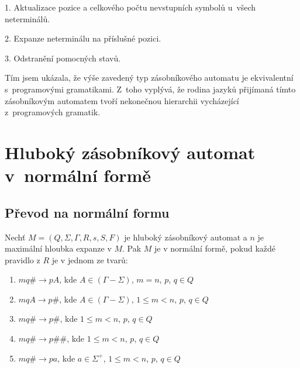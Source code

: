 \begin{list}{}{\setlength\parsep{0cm} \setlength\itemsep{0cm} \setlength\leftmargin{1em}}
\item 1. Aktualizace pozice a celkového počtu nevstupních symbolů u~všech neterminálů.
\item 2. Expanze neterminálu na příslušné pozici.
\item 3. Odstranění pomocných stavů.
\end{list}

Tím jsem ukázala, že výše zavedený typ zásobníkového automatu je ekvivalentní s~programovými gramatikami. Z~toho vyplývá, že rodina jazyků přijímaná tímto zásobníkovým automatem tvoří nekonečnou hierarchii vycházející z~programových gramatik.

\chapter{Hluboký zásobníkový automat v~normální formě}



\section{Převod na normální formu}


\begin{Def}
Nechť $M = (Q,\Sigma,\Gamma, R, s, S , F)$ je hluboký zásobníkový automat
a $n$ je maximální hloubka expanze v $M$.
Pak $M$ je v normální formě, pokud každé pravidlo z $R$ je v jednom ze tvarů:

\begin{enumerate}
\renewcommand{\labelenumi}{(\roman{enumi})}
\item $mq\# \rightarrow pA$, kde $A \in (\Gamma - \Sigma)$, $m = n$, $p$, $q \in Q$
\item $mqA \rightarrow p\#$, kde $A \in (\Gamma - \Sigma)$, $1 \le m < n$, $p$, $q \in Q$
\item $mq\# \rightarrow p\#$, kde $1 \le m < n$, $p$, $q \in Q$
\item $mq\# \rightarrow p\#\#$, kde $1 \le m < n$, $p$, $q \in Q$
\item $mq\# \rightarrow pa$, kde $a \in {\Sigma}^+$, $1 \le m < n$, $p$, $q \in Q$

\end{enumerate}

\end{Def}


